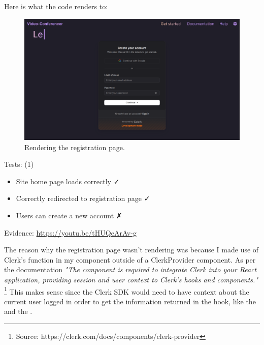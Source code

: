 Here is what the code renders to:

\begin{figure}[H]
\centering

\includegraphics[scale=0.2]{Images/Registration.png}

\caption{Rendering the registration page.}
\end{figure}

{\color{gray} \hrulefill}
\vspace{0.2cm}

{\sffamily Tests: (1)}
\begin{itemize}
  \item Site home page loads correctly \faCheck \\
  \item Correctly redirected to registration page \faCheck \\
  \item Users can create a new account \faClose \\
\end{itemize}

{\sffamily Evidence: \url{https://youtu.be/tHUQeArAv-g}}

{\color{gray} \hrulefill}
\vspace{0.2cm}

The reason why the registration page wasn't rendering was because
I made use of Clerk's  function in my
 component outside of a ClerkProvider component.
As per the documentation \textit{"The}
 \textit{component is required to integrate
Clerk into your React application, providing session and user
context to Clerk's hooks and components."}
\footnote{Source: https://clerk.com/docs/components/clerk-provider}
This makes sense since
the Clerk SDK would need to have context about the current user
logged in order to get the information returned in the
 hook, like the  and the
. \\ \vspace{0.2cm}


